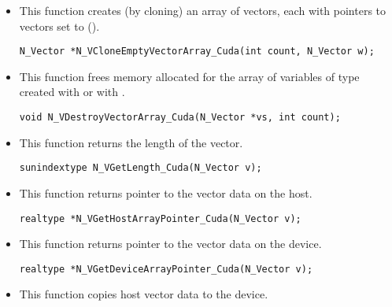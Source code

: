 \begin{itemize}

\item {}
 
  This function creates (by cloning) an array of  {\nveccuda} vectors,
  each with pointers to {\cuda} vectors set to ().
 
\begin{verbatim}
N_Vector *N_VCloneEmptyVectorArray_Cuda(int count, N_Vector w);
\end{verbatim}


\item {}
 
 This function frees memory allocated for the array of  variables of
 type  created with  or with
 .
 

 \verb|void N_VDestroyVectorArray_Cuda(N_Vector *vs, int count);|


\item {}
 
 This function returns the length of the vector.

 \verb|sunindextype N_VGetLength_Cuda(N_Vector v);|


\item {}
 
 This function returns pointer to the vector data on the host.

 \verb|realtype *N_VGetHostArrayPointer_Cuda(N_Vector v);|



\item {}
 
 This function returns pointer to the vector data on the device.

 \verb|realtype *N_VGetDeviceArrayPointer_Cuda(N_Vector v);|



\item {}
 
 This function copies host vector data to the device.


\end{itemize}
